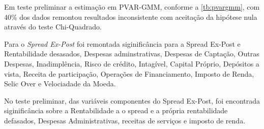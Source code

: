 \documentclass[
  12pt,
  12pt,
  openright,
  oneside,
  a4paper,
  chapter=TITLE,
  section=TITLE,
  subsection=TITLE,
  subsubsection=TITLE,
  english,
  portugues,
  sumario=tradicional]{abntex2}
\begin{document}
Em teste preliminar a estimação em PVAR-GMM, conforme a \autoref{tb:pvargmm}, com 40\% dos dados remontou resultados inconsistente com aceitação da hipótese nula através do teste Chi-Quadrado.

Para o \emph{Spread Ex-Post} foi remontada siginificância para a Spread Ex-Post e Rentabilidade desasados, Despesas adminstrativas, Despesas de Captação, Outras Despesas, Inadimplência, Risco de crédito, Intagível, Capital Próprio, Depósitos a vista, Receita de participação, Operações de Financiamento, Imposto de Renda, Selic Over e Velociadade da Moeda.

No teste preliminar, das variáveis componentes do Spread Ex-Post, foi encontrada siginificância sobre a Rentabilidade a o spread e a própria rentabilidade defasados, Despesas Administrativas, receitas de serviços e imposto de renda.

\vspace{20pt}
\vspace{-1mm}
\end{document}
